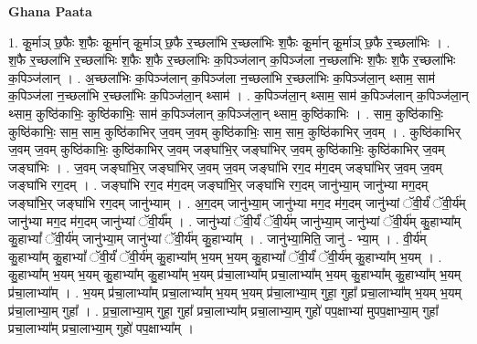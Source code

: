 \documentclass[17pt]{extarticle}
\begin{document}
\textbf{Ghana Paata } \newline

1. कू॒र्माञ् छ॒फैः श॒फैः कू॒र्मान् कू॒र्माञ् छ॒फै र॒च्छला॑भि र॒च्छला॑भिः श॒फैः कू॒र्मान् कू॒र्माञ् छ॒फै र॒च्छला॑भिः । . श॒फै र॒च्छला॑भि र॒च्छला॑भिः श॒फैः श॒फै र॒च्छला॑भिः क॒पिञ्ज॑लान् क॒पिञ्ज॑ला न॒च्छला॑भिः श॒फैः श॒फै र॒च्छला॑भिः क॒पिञ्ज॑लान् । . अ॒च्छला॑भिः क॒पिञ्ज॑लान् क॒पिञ्ज॑ला न॒च्छला॑भि र॒च्छला॑भिः क॒पिञ्ज॑ला॒न् थ्साम॒ साम॑ क॒पिञ्ज॑ला न॒च्छला॑भि र॒च्छला॑भिः क॒पिञ्ज॑ला॒न् थ्साम॑ । . क॒पिञ्ज॑ला॒न् थ्साम॒ साम॑ क॒पिञ्ज॑लान् क॒पिञ्ज॑ला॒न् थ्साम॒ कुष्ठि॑काभिः॒ कुष्ठि॑काभिः॒ साम॑ क॒पिञ्ज॑लान् क॒पिञ्ज॑ला॒न् थ्साम॒ कुष्ठि॑काभिः । . साम॒ कुष्ठि॑काभिः॒ कुष्ठि॑काभिः॒ साम॒ साम॒ कुष्ठि॑काभिर् ज॒वम् ज॒वम् कुष्ठि॑काभिः॒ साम॒ साम॒ कुष्ठि॑काभिर् ज॒वम् । . कुष्ठि॑काभिर् ज॒वम् ज॒वम् कुष्ठि॑काभिः॒ कुष्ठि॑काभिर् ज॒वम् जङ्घा॑भि॒र् जङ्घा॑भिर् ज॒वम् कुष्ठि॑काभिः॒ कुष्ठि॑काभिर् ज॒वम् जङ्घा॑भिः । . ज॒वम् जङ्घा॑भि॒र् जङ्घा॑भिर् ज॒वम् ज॒वम् जङ्घा॑भि रग॒द म॑ग॒दम् जङ्घा॑भिर् ज॒वम् ज॒वम् जङ्घा॑भि रग॒दम् । . जङ्घा॑भि रग॒द म॑ग॒दम् जङ्घा॑भि॒र् जङ्घा॑भि रग॒दम् जानु॑भ्या॒म् जानु॑भ्या मग॒दम् जङ्घा॑भि॒र् जङ्घा॑भि रग॒दम् जानु॑भ्याम् । . अ॒ग॒दम् जानु॑भ्या॒म् जानु॑भ्या मग॒द म॑ग॒दम् जानु॑भ्यां ॅवी॒र्यं॑ ॅवी॒र्य॑म् जानु॑भ्या मग॒द म॑ग॒दम् जानु॑भ्यां ॅवी॒र्य᳚म् । . जानु॑भ्यां ॅवी॒र्यं॑ ॅवी॒र्य॑म् जानु॑भ्या॒म् जानु॑भ्यां ॅवी॒र्य॑म् कु॒हाभ्या᳚म् कु॒हाभ्यां᳚ ॅवी॒र्य॑म् जानु॑भ्या॒म् जानु॑भ्यां ॅवी॒र्य॑म् कु॒हाभ्या᳚म् । . जानु॑भ्या॒मिति॒ जानु॑ - भ्या॒म् । . वी॒र्य॑म् कु॒हाभ्या᳚म् कु॒हाभ्यां᳚ ॅवी॒र्यं॑ ॅवी॒र्य॑म् कु॒हाभ्या᳚म् भ॒यम् भ॒यम् कु॒हाभ्यां᳚ ॅवी॒र्यं॑ ॅवी॒र्य॑म् कु॒हाभ्या᳚म् भ॒यम् । . कु॒हाभ्या᳚म् भ॒यम् भ॒यम् कु॒हाभ्या᳚म् कु॒हाभ्या᳚म् भ॒यम् प्र॑चा॒लाभ्या᳚म् प्रचा॒लाभ्या᳚म् भ॒यम् कु॒हाभ्या᳚म् कु॒हाभ्या᳚म् भ॒यम् प्र॑चा॒लाभ्या᳚म् । . भ॒यम् प्र॑चा॒लाभ्या᳚म् प्रचा॒लाभ्या᳚म् भ॒यम् भ॒यम् प्र॑चा॒लाभ्या॒म् गुहा॒ गुहा᳚ प्रचा॒लाभ्या᳚म् भ॒यम् भ॒यम् प्र॑चा॒लाभ्या॒म् गुहा᳚ । . प्र॒चा॒लाभ्या॒म् गुहा॒ गुहा᳚ प्रचा॒लाभ्या᳚म् प्रचा॒लाभ्या॒म् गुहो॑ पप॒क्षाभ्या॑ मुपप॒क्षाभ्या॒म् गुहा᳚ प्रचा॒लाभ्या᳚म् प्रचा॒लाभ्या॒म् गुहो॑ पप॒क्षाभ्या᳚म् । \newline
\end{document}
